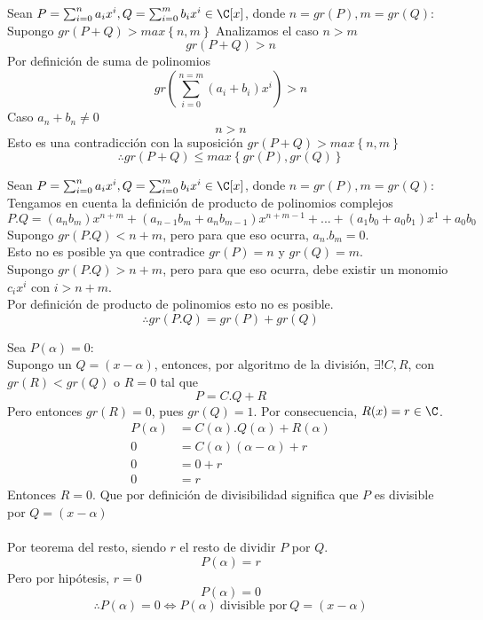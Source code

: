 \documentclass[10pt]{article}
\begin{document}
\begin{prf}{}
	Sean $P = \sum_{i=0}^{n}{a_ix^i}, Q = \sum_{i=0}^{m}{b_ix^i} \in \C[x]$, donde $n = gr(P), m = gr(Q)$:\\
	Supongo $gr(P+Q) > max\left\{n,m\right\}$
	Analizamos el caso $n > m$
	$$gr(P+Q) > n$$
	Por definición de suma de polinomios
	$$gr\left(\sum_{i=0}^{n=m}{(a_i+b_i)x^i}\right) > n$$
	Caso $a_n + b_n \neq 0$
	$$n > n$$
	Esto es una contradicción con la suposición $gr(P+Q) > max\left\{n,m\right\}$
	$$\therefore gr(P+Q) \leq max\left\{gr(P),gr(Q)\right\}$$
\end{prf}

\begin{prf}[$gr(P.Q) = gr(P)+gr(Q)$]{}
	Sean $P = \sum_{i=0}^{n}{a_ix^i}, Q = \sum_{i=0}^{m}{b_ix^i} \in \C[x]$, donde $n = gr(P), m = gr(Q)$:\\
	Tengamos en cuenta la definición de producto de polinomios complejos
	$$P.Q = (a_nb_m)x^{n+m} + (a_{n-1}b_m + a_nb_{m-1})x^{n+m-1} + ... + (a_1b_0 + a_0b_1)x^1 + a_0b_0$$
	Supongo $gr(P.Q) < n + m$, pero para que eso ocurra, $a_n.b_m = 0$.\\
	Esto no es posible ya que contradice $gr(P) = n$ y $gr(Q) = m$.\\
	Supongo $gr(P.Q) > n + m$, pero para que eso ocurra, debe existir un monomio $c_ix^{i}$ con $i > n+m$.\\
	Por definición de producto de polinomios esto no es posible.
	$$\therefore gr(P.Q) = gr(P)+gr(Q)$$
\end{prf}

\begin{prf}[$P(\alpha) = 0 \Leftrightarrow P(\alpha)\ \text{divisible por}\ Q = (x - \alpha)$]{}
	Sea $P(\alpha) = 0$:\\
	Supongo un $Q = (x-\alpha)$, entonces, por algoritmo de la división, $\exists! C, R$, con $gr(R) < gr(Q)$ o $R = 0$ tal que
	$$P = C.Q + R$$
	Pero entonces $gr(R) = 0$, pues $gr(Q) = 1$. Por consecuencia, $R(x) = r \in \C$.
	\begin{align}
		P(\alpha) &= C(\alpha).Q(\alpha) + R(\alpha)\\
		0 &= C(\alpha)(\alpha-\alpha) + r\\
		0 &= 0 + r\\
		0 &= r
	\end{align}
	Entonces $R = 0$. Que por definición de divisibilidad significa que $P$ es divisible por $Q = (x - \alpha)$\\
	\vspace{5mm}
	\\
	Por teorema del resto, siendo $r$ el resto de dividir $P$ por $Q$.
	$$P(\alpha) = r$$
	Pero por hipótesis, $r = 0$
	$$P(\alpha) = 0$$
	$$\therefore P(\alpha) = 0 \Leftrightarrow P(\alpha)\ \text{divisible por}\ Q = (x - \alpha)$$
\end{prf}
\end{document}
